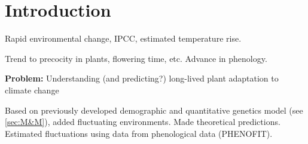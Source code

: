 \label{sec:Intro}
\section*{Introduction}

Rapid environmental change, IPCC, estimated temperature rise.

Trend to precocity in plants, flowering time, etc. Advance in phenology.

\textbf{Problem:} Understanding (and predicting?) long-lived plant adaptation to climate change

Based on previously developed demographic and quantitative genetics model (see \ref{sec:M&M}), added fluctuating environments. Made theoretical predictions. Estimated fluctuations using data from phenological data (PHENOFIT).